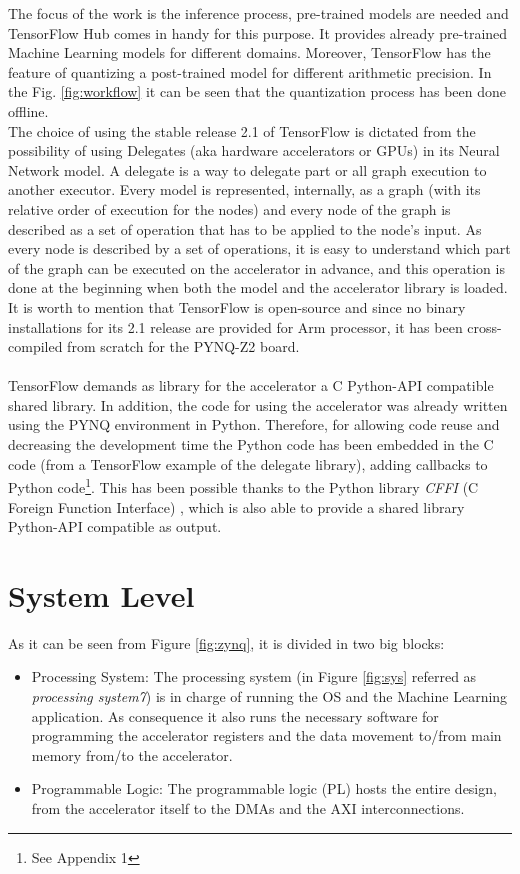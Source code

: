 The focus of the work is the inference process, pre-trained models are needed and TensorFlow Hub \cite{WEBSITE:5} comes in handy for this purpose. It provides already pre-trained Machine Learning models for different domains. Moreover, TensorFlow has the feature of quantizing a post-trained model for different arithmetic precision. In the Fig. \ref{fig:workflow} it can be seen that the quantization process has been done offline.\\
The choice of using the stable release 2.1 of TensorFlow is dictated from the possibility of using Delegates (aka hardware accelerators or GPUs) in its Neural Network model. A delegate is a way to delegate part or all graph execution to another executor. Every model is represented, internally, as a graph (with its relative order of execution for the nodes) and every node of the graph is described as a set of operation that has to be applied to the node's input. As every node is described by a set of operations, it is easy to understand which part of the graph can be executed on the accelerator in advance, and this operation is done at the beginning when both the model and the accelerator library is loaded. It is worth to mention that TensorFlow is open-source and since no binary installations for its 2.1 release are provided for Arm processor, it has been cross-compiled from scratch for the PYNQ-Z2 board. \\\\

TensorFlow demands as library for the accelerator a C Python-API compatible shared library. In addition, the code for using the accelerator was already written using the PYNQ environment in Python. Therefore, for allowing code reuse and decreasing the development time the Python code has been embedded in the C code (from a TensorFlow example of the delegate library), adding callbacks to Python code\footnote{See Appendix 1}. This has been possible thanks to the Python library \textit{CFFI} (C Foreign Function Interface) \cite{WEBSITE:14}, which is also able to provide a shared library Python-API compatible as output.


\newpage
\section{System Level}

As it can be seen from Figure \ref{fig:zynq}, it is divided in two big blocks:
\begin{itemize}
\item Processing System:
The processing system (in Figure \ref{fig:sys} referred as \textit{processing system7}) is in charge of running the OS and the Machine Learning application. As consequence it also runs the necessary software for programming the accelerator registers and the data movement to/from main memory from/to the accelerator.
\item Programmable Logic:
The programmable logic (PL) hosts the entire design, from the accelerator itself to the DMAs and the AXI interconnections.
\end{itemize}

